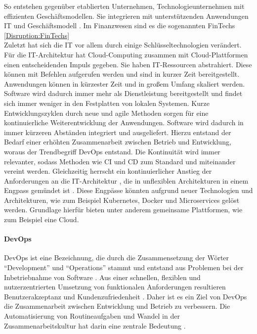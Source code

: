 So entstehen gegenüber etablierten Unternehmen, Technologieunternehmen mit effizienten Geschäftsmodellen. Sie integrieren mit unterstützenden Anwendungen IT und Geschäftsmodell \cite{Bussmann2006}. Im Finanzwesen sind es die sogenannten FinTechs \ref{Disruption:FinTechs}
\medskip
\\
Zuletzt hat sich die IT vor allem durch einige Schlüsseltechnologien verändert. Für die IT-Architektur hat Cloud-Computing zusammen mit Cloud-Plattformen einen entscheidenden Impuls gegeben. Sie haben IT-Ressourcen abstrahiert. Diese können mit Befehlen aufgerufen werden und sind in kurzer Zeit bereitgestellt. Anwendungen können in kürzester Zeit und in großem Umfang skaliert werden. Software wird dadurch immer mehr als Dienstleistung bereitgestellt und findet sich immer weniger in den Festplatten von lokalen Systemen. Kurze Entwicklungszyklen durch neue und agile Methoden sorgen für eine kontinuierliche Weiterentwicklung der Anwendungen. Software wird dadurch in immer kürzeren Abständen integriert und ausgeliefert. Hierzu entstand der Bedarf einer erhöhten Zusammenarbeit zwischen Betrieb und Entwicklung, woraus der Trendbegriff DevOps entstand. Die Kontinuität wird immer relevanter, sodass Methoden wie \ac{CI} und \ac{CD} zum Standard und miteinander vereint werden. Gleichzeitig herrscht ein kontinuierlicher Anstieg der Anforderungen an die IT-Architektur \cite{Bussmann2006}, die in unflexiblen Architekturen in einem Engpass gemündet ist \cite{Brockhoff2006, Bussmann2006}. Diese Engpässe könnten aufgrund neuer Technologien und Architekturen, wie zum Beispiel Kubernetes, Docker und Microservices gelöst werden. Grundlage hierfür bieten unter anderem gemeinsame Plattformen, wie zum Beispiel eine Cloud.

\paragraph{DevOps}
DevOps ist eine Bezeichnung, die durch die Zusammensetzung der Wörter \enquote{Development} und \enquote{Operations} stammt und entstand aus Problemen bei der Inbetriebnahme von Software \cite{mci/Disterer2011}. Aus einer schnellen, flexiblen und nutzerzentrierten Umsetzung von funktionalen Anforderungen resultieren Benutzerakzeptanz und Kundenzufriedenheit \cite{mci/Disterer2011, Alt2017}. Daher ist es ein Ziel von DevOps die Zusammenarbeit zwischen Entwicklung und Betrieb zu verbessern. Die Automatisierung von Routineaufgaben und Wandel in der Zusammenarbeitskultur hat darin eine zentrale Bedeutung \cite{Alt2017}. 

